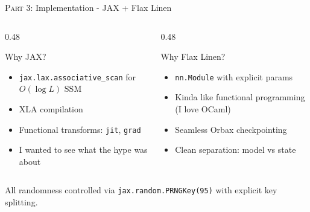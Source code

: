 \documentclass[aspectratio=169]{beamer}
\begin{document}
	\begin{frame}{\textsc{Part 3:} Implementation - JAX + Flax Linen}
		\begin{columns}[onlytextwidth]
			\begin{column}{0.48\textwidth}
				\begin{block}{Why JAX?}
					\small
					\begin{itemize}
						\item \texttt{jax.lax.associative\_scan} for $O(\log L)$ SSM
						\item XLA compilation
						\item Functional transforms: \texttt{jit}, \texttt{grad}
						\item I wanted to see what the hype was about
					\end{itemize}
				\end{block}
			\end{column}
			\begin{column}{0.48\textwidth}
				\begin{block}{Why Flax Linen?}
					\small
					\begin{itemize}
						\item \texttt{nn.Module} with explicit params
						\item Kinda like functional programming (I love OCaml)
						\item Seamless Orbax checkpointing
						\item Clean separation: model vs state
					\end{itemize}
				\end{block}
			\end{column}
		\end{columns}
		\vspace{0.5em}
		\centering\small
		All randomness controlled via \texttt{jax.random.PRNGKey(95)} with explicit key splitting.
	\end{frame}
\end{document}
